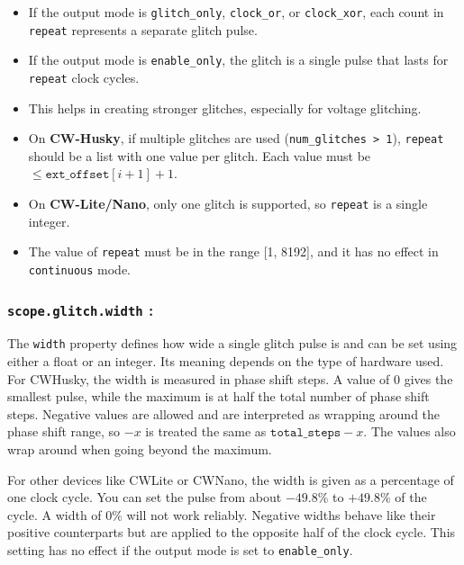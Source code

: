 \begin{itemize}
    \item If the output mode is \texttt{glitch\_only}, \texttt{clock\_or}, or \texttt{clock\_xor}, each count in \texttt{repeat} represents a separate glitch pulse.
    
    \item If the output mode is \texttt{enable\_only}, the glitch is a single pulse that lasts for \texttt{repeat} clock cycles.
    
    \item This helps in creating stronger glitches, especially for voltage glitching.
    
    \item On \textbf{CW-Husky}, if multiple glitches are used (\texttt{num\_glitches > 1}), \texttt{repeat} should be a list with one value per glitch. Each value must be $\leq \texttt{ext\_offset}[i+1] + 1$.
    
    \item On \textbf{CW-Lite/Nano}, only one glitch is supported, so \texttt{repeat} is a single integer.
    
    \item The value of \texttt{repeat} must be in the range [1, 8192], and it has no effect in \texttt{continuous} mode.
\end{itemize}
\subsubsection{\textbf{\texttt{scope.glitch.width} :}} 
The \texttt{width} property defines how wide a single glitch pulse is and can be set using either a float or an integer. Its meaning depends on the type of hardware used. For CWHusky, the width is measured in phase shift steps. A value of 0 gives the smallest pulse, while the maximum is at half the total number of phase shift steps. Negative values are allowed and are interpreted as wrapping around the phase shift range, so $-x$ is treated the same as $\texttt{total\_steps} - x$. The values also wrap around when going beyond the maximum.

For other devices like CWLite or CWNano, the width is given as a percentage of one clock cycle. You can set the pulse from about $-49.8\%$ to $+49.8\%$ of the cycle. A width of $0\%$ will not work reliably. Negative widths behave like their positive counterparts but are applied to the opposite half of the clock cycle. This setting has no effect if the output mode is set to \texttt{enable\_only}.


